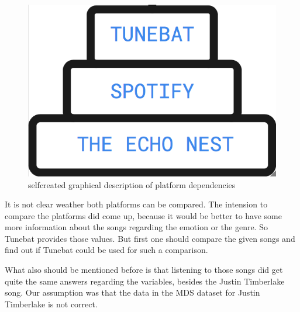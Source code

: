\documentclass[]{article}
\begin{document}
\begin{figure}
\centering
\includegraphics{./picturesDocu/dependencies.png}
\caption{selfcreated graphical description of platform dependencies}
\end{figure}

It is not clear weather both platforms can be compared. The intension to
compare the platforms did come up, because it would be better to have
some more information about the songs regarding the emotion or the
genre. So Tunebat provides those values. But first one should compare
the given songs and find out if Tunebat could be used for such a
comparison.

What also should be mentioned before is that listening to those songs
did get quite the same answers regarding the variables, besides the
Justin Timberlake song. Our assumption was that the data in the MDS
dataset for Justin Timberlake is not correct.
\end{document}
